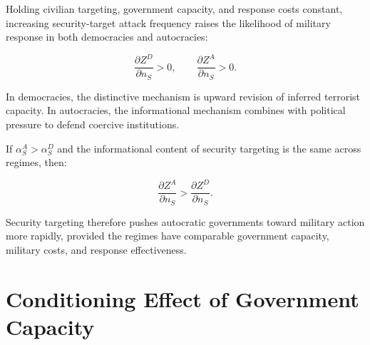 \documentclass[
  letterpaper,
  DIV=11,
  numbers=noendperiod]{scrartcl}
\begin{document}
\begin{tcolorbox}[enhanced jigsaw, arc=.35mm, bottomrule=.15mm, bottomtitle=1mm, breakable, colback=white, colbacktitle=quarto-callout-important-color!10!white, colframe=quarto-callout-important-color-frame, coltitle=black, left=2mm, leftrule=.75mm, opacityback=0, opacitybacktitle=0.6, rightrule=.15mm, title=\textcolor{quarto-callout-important-color}{\faExclamation}\hspace{0.5em}{Proposition 2: Security-target frequency}, titlerule=0mm, toprule=.15mm, toptitle=1mm]

Holding civilian targeting, government capacity, and response costs
constant, increasing security-target attack frequency raises the
likelihood of military response in both democracies and autocracies:

\[
\frac{\partial Z^D}{\partial n_S}>0,
\qquad
\frac{\partial Z^A}{\partial n_S}>0.
\]

In democracies, the distinctive mechanism is upward revision of inferred
terrorist capacity. In autocracies, the informational mechanism combines
with political pressure to defend coercive institutions.

\end{tcolorbox}

\begin{tcolorbox}[enhanced jigsaw, arc=.35mm, bottomrule=.15mm, bottomtitle=1mm, breakable, colback=white, colbacktitle=quarto-callout-important-color!10!white, colframe=quarto-callout-important-color-frame, coltitle=black, left=2mm, leftrule=.75mm, opacityback=0, opacitybacktitle=0.6, rightrule=.15mm, title=\textcolor{quarto-callout-important-color}{\faExclamation}\hspace{0.5em}{Proposition 3: Autocratic security amplification}, titlerule=0mm, toprule=.15mm, toptitle=1mm]

If \(\alpha_S^A>\alpha_S^D\) and the informational content of security
targeting is the same across regimes, then:

\[
\frac{\partial Z^A}{\partial n_S}
>
\frac{\partial Z^D}{\partial n_S}.
\]

Security targeting therefore pushes autocratic governments toward
military action more rapidly, provided the regimes have comparable
government capacity, military costs, and response effectiveness.

\end{tcolorbox}

\section{Conditioning Effect of Government
Capacity}\label{conditioning-effect-of-government-capacity}
\end{document}
